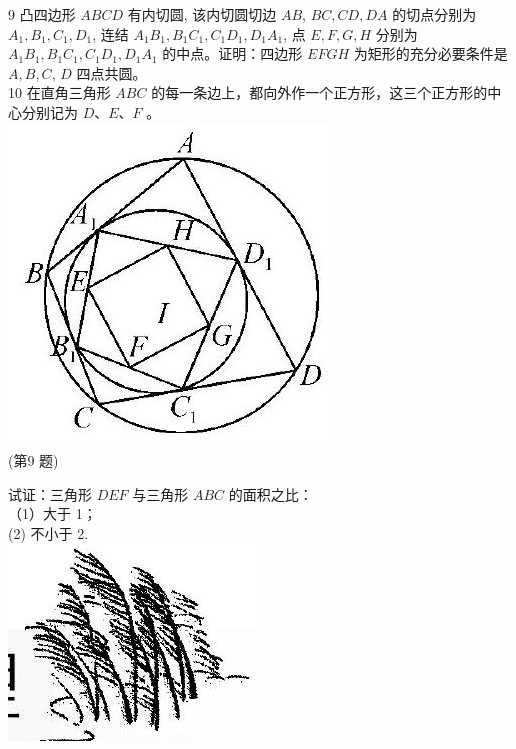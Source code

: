 \documentclass[10pt]{article}
\begin{document}
9 凸四边形 $A B C D$ 有内切圆, 该内切圆切边 $A B$, $B C, C D, D A$ 的切点分别为 $A_{1}, B_{1}, C_{1}, D_{1}$, 连结 $A_{1} B_{1}, B_{1} C_{1}, C_{1} D_{1}, D_{1} A_{1}$, 点 $E, F, G, H$ 分别为 $A_{1} B_{1}, B_{1} C_{1}, C_{1} D_{1}, D_{1} A_{1}$ 的中点。证明：四边形 $E F G H$ 为矩形的充分必要条件是 $A, B, C$, $D$ 四点共圆。\\
10 在直角三角形 $A B C$ 的每一条边上，都向外作一个正方形，这三个正方形的中心分别记为 $D 、 E 、 F$ 。\\
\includegraphics[max width=\textwidth, center]{2024_10_30_66b8e5e701da2093c133g-051}\\
(第9 题)

试证：三角形 $D E F$ 与三角形 $A B C$ 的面积之比：\\
（1）大于 1；\\
(2) 不小于 2.\\
\includegraphics[max width=\textwidth, center]{2024_10_30_66b8e5e701da2093c133g-052(3)}
\end{document}
